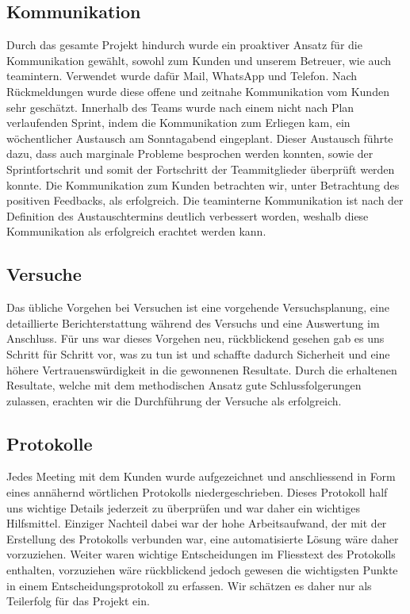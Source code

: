 \subsection{Kommunikation}
Durch das gesamte Projekt hindurch wurde ein proaktiver Ansatz für die Kommunikation gewählt, sowohl zum Kunden und unserem Betreuer, wie auch teamintern. Verwendet wurde dafür Mail, WhatsApp und Telefon. Nach Rückmeldungen wurde diese offene und zeitnahe Kommunikation vom Kunden sehr geschätzt. Innerhalb des Teams wurde nach einem nicht nach Plan verlaufenden Sprint, indem die Kommunikation zum Erliegen kam, ein wöchentlicher Austausch am Sonntagabend eingeplant. Dieser Austausch führte dazu, dass auch marginale Probleme besprochen werden konnten, sowie der Sprintfortschrit und somit der Fortschritt der Teammitglieder überprüft werden konnte. Die Kommunikation zum Kunden betrachten wir, unter Betrachtung des positiven Feedbacks, als erfolgreich. Die teaminterne Kommunikation ist nach der Definition des Austauschtermins deutlich verbessert worden, weshalb diese Kommunikation als erfolgreich erachtet werden kann.

\subsection{Versuche}
Das übliche Vorgehen bei Versuchen ist eine vorgehende Versuchsplanung, eine detaillierte Berichterstattung während des Versuchs und eine Auswertung im Anschluss. Für uns war dieses Vorgehen neu, rückblickend gesehen gab es uns Schritt für Schritt vor, was zu tun ist und schaffte dadurch Sicherheit und eine höhere Vertrauenswürdigkeit in die gewonnenen Resultate. Durch die erhaltenen Resultate, welche mit dem methodischen Ansatz gute Schlussfolgerungen zulassen, erachten wir die Durchführung der Versuche als erfolgreich.

\subsection{Protokolle}
Jedes Meeting mit dem Kunden wurde aufgezeichnet und anschliessend in Form eines annähernd wörtlichen Protokolls niedergeschrieben. Dieses Protokoll half uns wichtige Details jederzeit zu überprüfen und war daher ein wichtiges Hilfsmittel. Einziger Nachteil dabei war der hohe Arbeitsaufwand, der mit der Erstellung des Protokolls verbunden war, eine automatisierte Lösung wäre daher vorzuziehen. Weiter waren wichtige Entscheidungen im Fliesstext des Protokolls enthalten, vorzuziehen wäre rückblickend jedoch gewesen die wichtigsten Punkte in einem Entscheidungsprotokoll zu erfassen. Wir schätzen es daher nur als Teilerfolg für das Projekt ein.
